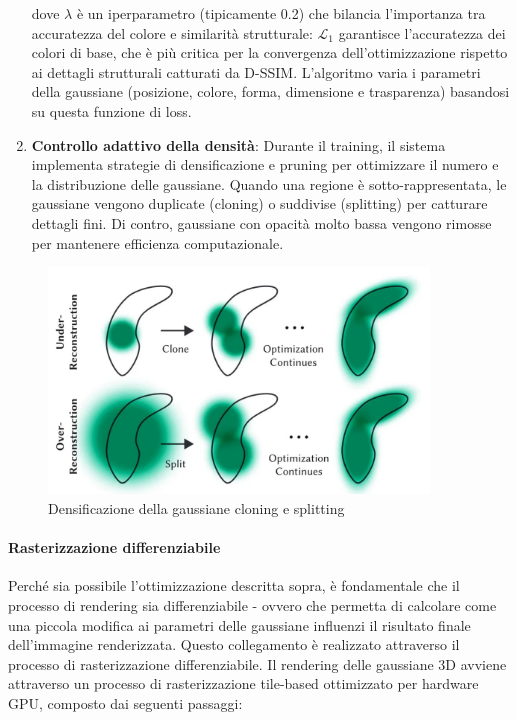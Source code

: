\begin{enumerate}
    dove $\lambda$ è un iperparametro (tipicamente 0.2) che bilancia l'importanza tra accuratezza del colore e similarità strutturale: $\mathcal{L}_1$ garantisce l'accuratezza dei colori di base, che è più critica per la convergenza dell'ottimizzazione rispetto ai dettagli strutturali catturati da D-SSIM.
    L'algoritmo varia i parametri della gaussiane (posizione, colore, forma, dimensione e trasparenza) basandosi su questa funzione di loss.
    
    \item \textbf{Controllo adattivo della densità}: Durante il training, il sistema implementa strategie di densificazione e pruning per ottimizzare il numero e la distribuzione delle gaussiane. Quando una regione è sotto-rappresentata, le gaussiane vengono duplicate (cloning) o suddivise (splitting) per catturare dettagli fini. Di contro, gaussiane con opacità molto bassa vengono rimosse per mantenere efficienza computazionale.
\end{enumerate}

\begin{figure}[htbp]
    \centering
    \includegraphics[width=0.9\textwidth]{images/densification.jpg}
    \caption{Densificazione della gaussiane cloning e splitting}
    \label{fig:densification}
\end{figure}

\paragraph{Rasterizzazione differenziabile}
Perché sia possibile l'ottimizzazione descritta sopra, è fondamentale che il processo di rendering sia differenziabile - ovvero che permetta di calcolare come una piccola modifica ai parametri delle gaussiane influenzi il risultato finale dell'immagine renderizzata. Questo collegamento è realizzato attraverso il processo di rasterizzazione differenziabile.
Il rendering delle gaussiane 3D avviene attraverso un processo di rasterizzazione tile-based ottimizzato per hardware GPU, composto dai seguenti passaggi:

